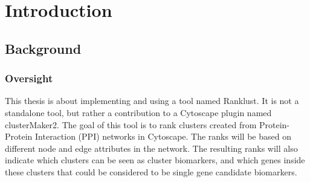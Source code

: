 \part{Introduction}
\label{pa:intro}
\chapter{Background}
\section{Oversight}
This thesis is about implementing and using a tool named Ranklust. It is not
a standalone tool, but rather a contribution to a Cytoscape plugin named
clusterMaker2\cite{cm2}\cite{cm2-github}. The goal of this tool is to rank
clusters created from Protein-Protein Interaction (PPI) networks in Cytoscape.
The ranks will be based on different node and edge attributes in the network.
The resulting ranks will also indicate which clusters can be seen as cluster
biomarkers, and which genes inside these clusters that could be considered to be
single gene candidate biomarkers. 

